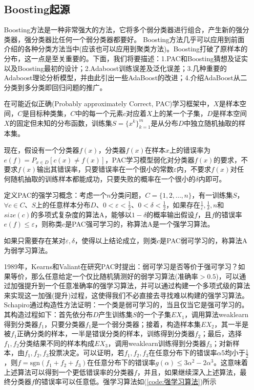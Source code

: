     \subsection{Boosting起源}
        \par
        Boosting方法是一种非常强大的方法，它将多个弱分类器进行组合，产生新的强分类器，强分类器比任何一个弱分类器都要好。
        Boosting方法几乎可以应用到前面介绍的各种分类方法当中(应该也可以应用到聚类方法)。Boosting打破了原样本的分布，这一点是至关重要的。下面，我们将要描述：1.PAC和Boosting猜想及证实以及Boosting最初的设计；2.Adaboost训练误差及泛化误差；3.几种重要的Adaboost理论分析模型，并由此引出一些AdaBoost的改进；4.介绍AdaBoost从二分类到多分类即回归问题的推广。
        \par
        在可能近似正确(Probably approximately Correct, PAC)学习框架中，$X$是样本空间，$C$是目标种类集，$C$中的每一个元素$c$对应着$X$上的某一个子集，$D$是样本空间$X$的固定但未知的分布函数，训练集$S = \{x^k\}_{k=1}^m$是从分布$D$中独立随机抽取的样本集。
        \par
        现在，假设有一个分类器$f(x)$，分类器$f(x)$在样本$x$上的错误率为$e(f) = P_{x\in D}[c(x) \neq f(x)]$，PAC学习模型弱化对分类器$f(x)$的要求，不要求$f(x)$输出其错误率，只要错误率在一个很小的常数$\varepsilon$内，不要求$f(x)$对任何随机抽取的训练样本都能成功，只要失败的概率在一个很小的$\delta$内即可。
        \par
        定义PAC的强学习概念：考虑一个$n$分类问题，$C=\{1,2,\dots,n\}$，有一训练集$S$，$\forall c\in C$、$S$上的任意样本分布$D$、$0<\varepsilon <\frac{1}{2}$、$0<\delta<\frac{1}{2}$，如果存在$\frac{1}{\varepsilon},\frac{1}{\delta},n$和$size(c)$的多项式复杂度的算法A，能够以$1-\delta$的概率输出假设$f$，且$f$的错误率$e(f) \leqslant \varepsilon$，则称类$c$是PAC强可学习的，称算法A是一个强学习算法。
        \par
        如果只需要存在某对$\varepsilon,\delta$，使得以上结论成立，则类$c$是PAC弱可学习的，称算法A为弱学习算法。
        \par
        1989年，Kearns和Valiant在研究PAC时提出\cite{1984.Valiant}：弱可学习是否等价于强可学习？如果等价，那么任意给定一个仅比随机猜测好的弱学习算法(准确率$>0.5$)，可以通过加强提升到一个任意准确率的强学习算法，并可以通过构建一个多项式级的算法来实现这一加强(提升)过程，这使得我们不必直接去寻找难以构建的强学习算法。Schapiro通过构造性方法证明：一个类是弱可学习的，当且仅当它是强可学习的。其构造过程如下：首先依分布$D$产生训练集$S$的一个子集$EX_1$，调用算法weaklearn得到分类器$f_1$，只要分类器$f_1$是一个弱分类器；接着，构造样本集$EX_2$，其一半是被$f_1$正确分类的样本，一半是错误分类的样本，训练得到分类器$f_2$；最后，选择$f_1,f_2$分类结果不同的样本构成$EX_3$，调用weaklearn训练得到分类器$f_3$；对新样本，由$f_1,f_2,f_3$投票决定。可以证明，若$f_1,f_2,f_3$在任意分布下的错误率$\alpha$5均小于$\frac{1}{2}$，则$f = \mathrm{sgn}(f_1+f_2+f_3)$在任意分布下的错误率$g(\alpha) \leqslant 3\alpha^2-2\alpha^3$。这意味着上述算法可以得到一个更低错误率的分类器$f$，并且，如果继续深入上述算法，最终分类器$f$的错误率可以任意低。强学习算法如(\ref{code:强学习算法})所示
